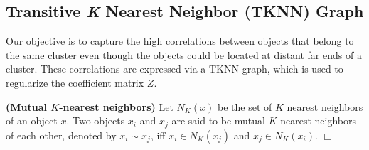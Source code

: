 \subsection*{Transitive {\it K} Nearest Neighbor (TKNN) Graph}



Our objective is to capture the high correlations between objects that belong to the same cluster even 
 though the objects could be located at distant far ends of a cluster. 
 These correlations are expressed via a TKNN graph, which is used to 
 regularize the coefficient matrix $Z$.

\begin{definition}
\label{def:nei_relation}
\textbf{(Mutual  $K$-nearest neighbors)}
Let $N_K(x)$ be the set of $K$ nearest neighbors of an object $x$.
Two objects $x_i$ and $x_j$ are said to be mutual $K$-nearest neighbors of each other,
denoted by $x_i \sim x_j$, 
iff $x_i \in N_K(x_j)$ and $x_j \in N_K(x_i)$.
\hfill$\Box$
\end{definition}


